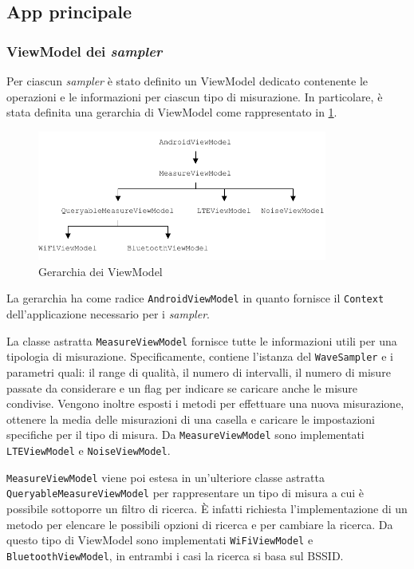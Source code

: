\subsection{App principale}

\subsubsection{ViewModel dei \textit{sampler}} \label{sec:MeasureViewModel}
Per ciascun \textit{sampler} è stato definito un ViewModel dedicato contenente le operazioni e le informazioni per ciascun tipo di misurazione.
In particolare, è stata definita una gerarchia di ViewModel come rappresentato in \cref{fig:viewmodel_hierarchy}.

\begin{figure}[H]
  \centering
  \includegraphics[width=0.85\textwidth]{./img/viewmodel.pdf}
  \caption{Gerarchia dei ViewModel} \label{fig:viewmodel_hierarchy}
\end{figure}

La gerarchia ha come radice \texttt{AndroidViewModel} in quanto fornisce il \texttt{Context} dell'applicazione necessario per i \textit{sampler}.

La classe astratta \texttt{MeasureViewModel} fornisce tutte le informazioni utili per una tipologia di misurazione. Specificamente, contiene l'istanza del \texttt{WaveSampler} e i parametri quali: il range di qualità, il numero di intervalli, il numero di misure passate da considerare e un flag per indicare se caricare anche le misure condivise.
Vengono inoltre esposti i metodi per effettuare una nuova misurazione, ottenere la media delle misurazioni di una casella e caricare le impostazioni specifiche per il tipo di misura.
Da \texttt{MeasureViewModel} sono implementati \texttt{LTEViewModel} e \texttt{NoiseViewModel}.

\texttt{MeasureViewModel} viene poi estesa in un'ulteriore classe astratta \texttt{QueryableMeasureViewModel} per rappresentare un tipo di misura a cui è possibile sottoporre un filtro di ricerca. È infatti richiesta l'implementazione di un metodo per elencare le possibili opzioni di ricerca e per cambiare la ricerca. Da questo tipo di ViewModel sono implementati \texttt{WiFiViewModel} e \texttt{BluetoothViewModel}, in entrambi i casi la ricerca si basa sul BSSID.


